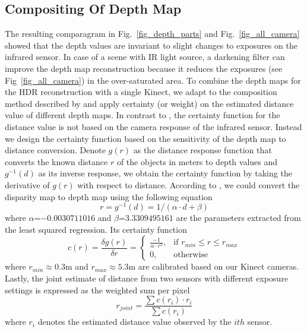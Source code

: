 \subsection{Compositing Of Depth Map}
The resulting comparagram in Fig.~\ref{fig_depth_parts} and Fig.~\ref{fig_all_camera} showed that the depth values are invariant to slight changes to exposures on the infrared sensor. In case of a scene with IR light source, a darkening filter can improve the depth map reconstruction because it reduces the exposures (see Fig~\ref{fig_all_camera}) in the over-saturated area. To combine the depth maps for the HDR reconstruction with a single Kinect, we adapt to the composition method described by \cite{mannwyckofftr} and apply certainty (or weight) on the estimated distance value of different depth maps. In contrast to \cite{mannwyckofftr}, the certainty function for the distance value is not based on the camera response of the infrared sensor. Instead we design the certainty function based on the sensitivity of the depth map to distance conversion. Denote $g(r)$ as the distance response function that converts the known distance $r$ of the objects in meters to depth values and $g^{-1}(d)$ as its inverse response, we obtain the certainty function by taking the derivative of $g(r)$ with respect to distance. According to \cite{mann2011blind}, we could convert the disparity map to depth map using the following equation
\begin{equation}
r = g^{-1}(d) = 1/(\alpha \cdot d + \beta)
\end{equation} 
where $\alpha$=$-0.0030711016$ and $\beta$=$3.3309495161$ are the parameters extracted from the least squared regression. Its certainty function \begin{equation}
c(r) = \frac{\delta g(r)}{\delta r} = 
\begin{cases} \frac{-1}{\alpha \cdot r^2}, 
			& \mbox{if } r_{min} \le r \le r_{max} \\
			0, & \mbox{otherwise}
 \end{cases}
\end{equation}
where $r_{min}$$\approx$$0.3$m and $r_{max}$$\approx$$5.3$m are calibrated based on our Kinect cameras.
Lastly, the joint estimate of distance from two sensors with different exposure settings is expressed as the weighted sum per pixel
\begin{equation}
r_{joint} = \frac{\sum c(r_i) \cdot r_i}{\sum c(r_i)}
\label{eq_depth_sum}
\end{equation}
where $r_i$ denotes the estimated distance value observed by the $ith$ sensor.
